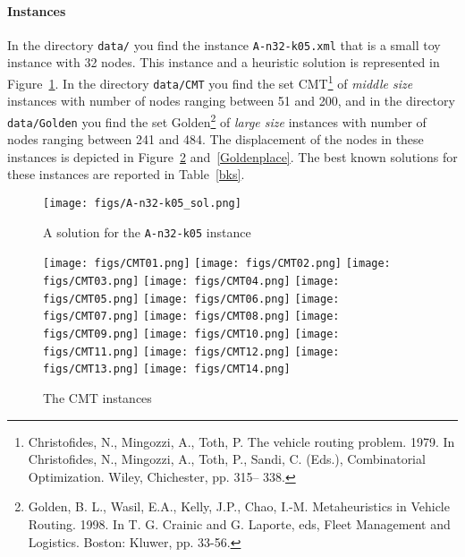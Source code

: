 \paragraph{Instances}
In the directory \verb!data/! you find the instance
\lstinline{A-n32-k05.xml} that is a small toy instance with 32 nodes.
This instance and a heuristic solution is represented in
Figure~\ref{A-n32-k05}.  In the directory \verb!data/CMT! you find the
set CMT\footnote{Christofides, N., Mingozzi, A., Toth, P. The vehicle
  routing problem. 1979.  In Christofides, N., Mingozzi, A., Toth, P.,
  Sandi, C. (Eds.), Combinatorial Optimization. Wiley, Chichester,
  pp. 315– 338.} of \emph{middle size} instances with number of nodes
ranging between 51 and 200, and in the directory \verb!data/Golden! you
find the set Golden\footnote{Golden, B. L., Wasil, E.A., Kelly, J.P.,
  Chao, I.-M. Metaheuristics in Vehicle Routing. 1998. In T. G. Crainic
  and G. Laporte, eds, Fleet Management and Logistics. Boston: Kluwer,
  pp. 33-56.} of \emph{large size} instances with number of nodes
ranging between 241 and 484. The displacement of the nodes in these
instances is depicted in Figure~\ref{CMTplace} and~\ref{Goldenplace}.
The best known solutions for these instances are reported in
Table~\ref{bks}.

%
%

\begin{figure}
  \centering
  \texttt{[image: figs/A-n32-k05\_sol.png]}
\caption{\label{A-n32-k05} A solution for the \texttt{A-n32-k05} instance}
\end{figure}

\begin{figure}
  \centering
  \texttt{[image: figs/CMT01.png]}
  \texttt{[image: figs/CMT02.png]}
  \texttt{[image: figs/CMT03.png]}
  \texttt{[image: figs/CMT04.png]}
  \texttt{[image: figs/CMT05.png]}
  \texttt{[image: figs/CMT06.png]}
  \texttt{[image: figs/CMT07.png]}
  \texttt{[image: figs/CMT08.png]}
  \texttt{[image: figs/CMT09.png]}
  \texttt{[image: figs/CMT10.png]}
  \texttt{[image: figs/CMT11.png]}
  \texttt{[image: figs/CMT12.png]}
  \texttt{[image: figs/CMT13.png]}
  \texttt{[image: figs/CMT14.png]}
\caption{\label{CMTplace} The CMT instances}
\end{figure}



